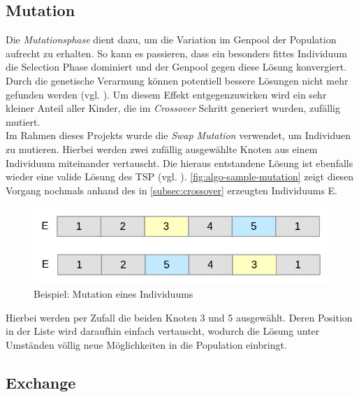 \documentclass[12pt,a4paper]{scrreprt}
\begin{document}
\subsection{Mutation}
\label{subsec:mutation}

Die \textit{Mutationsphase} dient dazu, um die Variation im Genpool der Population aufrecht zu erhalten. So kann es passieren, dass ein besonders fittes Individuum die Selection Phase dominiert und der Genpool gegen diese Lösung konvergiert. Durch die genetische Verarmung können potentiell bessere Lösungen nicht mehr gefunden werden (vgl. \cite{rongqu14}). Um diesem Effekt entgegenzuwirken wird ein sehr kleiner Anteil aller Kinder, die im \textit{Crossover} Schritt generiert wurden, zufällig mutiert.\\
Im Rahmen dieses Projekts wurde die \textit{Swap Mutation} verwendet, um Individuen zu mutieren. Hierbei werden zwei zufällig ausgewählte Knoten aus einem Individuum miteinander vertauscht. Die hieraus entstandene Lösung ist ebenfalls wieder eine valide Lösung des TSP (vgl. \cite{jacobsen12B}). \autoref{fig:algo-sample-mutation} zeigt diesen Vorgang nochmals anhand des in \autoref{subsec:crossover} erzeugten Individuums E.


\begin{figure}[ht]
  	\centering
	\includegraphics[width=400pt]{images/algo_05_mutation.png}
	\caption{Beispiel: Mutation eines Individuums}
	\label{fig:algo-sample-mutation}
\end{figure}

Hierbei werden per Zufall die beiden Knoten 3 und 5 ausgewählt. Deren Position in der Liste wird daraufhin einfach vertauscht, wodurch die Lösung unter Umständen völlig neue Möglichkeiten in die Population einbringt.

\subsection{Exchange}
\label{sec:exchange}
\end{document}
